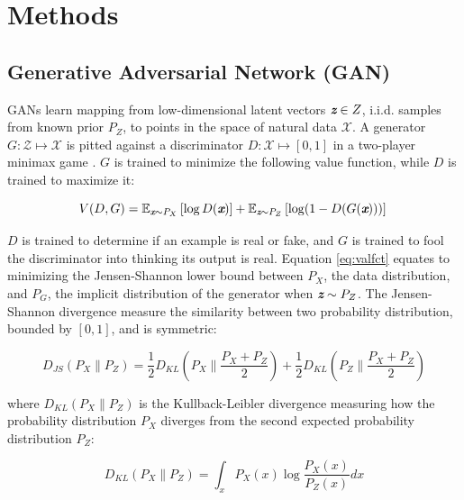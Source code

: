 \documentclass{article} %
\newcommand{\e}{\mathbb E}
\begin{document}
\section{Methods}

\subsection{Generative Adversarial Network (GAN)}
GANs learn mapping from low-dimensional latent vectors $\textit{\textbf{z}}\in Z$, i.i.d. samples from known prior $P_Z$, to points in the space of natural data $\mathcal{X}$. A generator $G : \mathcal{Z} \mapsto \mathcal{X}$ is pitted against a discriminator $D : \mathcal{X} \mapsto \left[0,1\right]$ in a two-player minimax game \cite{goodfellow2014}. $G$ is trained to minimize the following value function, while $D$ is trained to maximize it:

\begin{equation}
    V(D,G) = \e_{\textit{\textbf{x}}\sim P_X} \left[\log D(\textit{\textbf{x}})\right] + \e_{\textit{\textbf{z}}\sim P_Z} \left[\log (1-D(G(\textit{\textbf{x}})))\right] \\
    \label{eq:valfct}
\end{equation}

$D$ is trained to determine if an example is real or fake, and $G$ is trained to fool the discriminator into thinking its output is real. Equation \ref{eq:valfct} equates to minimizing the Jensen-Shannon lower bound between $P_X$, the data distribution, and $P_G$, the implicit distribution of the generator when $\textit{\textbf{z}}\sim P_Z$. The Jensen-Shannon divergence measure the similarity between two probability distribution, bounded by $\left[0,1\right]$, and is symmetric:

\begin{equation}
    D_{JS}(P_X\| P_Z) = \frac{1}{2}D_{KL}\left(P_X\| \frac{P_X+P_Z}{2}\right) +\frac{1}{2}D_{KL}\left(P_Z\| \frac{P_X+P_Z}{2}\right)
\end{equation}

where $D_{KL}(P_X\| P_Z)$ is the Kullback-Leibler divergence measuring how the probability distribution $P_X$ diverges from the second expected probability distribution $P_Z$:

\begin{equation}
    D_{KL}(P_X\| P_Z)=\int_x P_X(x)\log \frac{P_X(x)}{P_Z(x)}dx
\end{equation}
\end{document}
